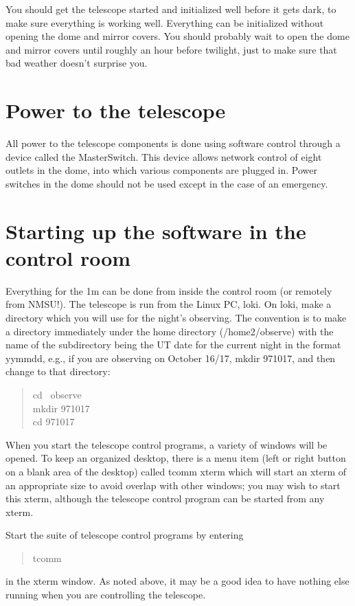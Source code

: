\documentclass[10pt]{report}
\renewcommand{\[}{\begin{eqnarray}}
\renewcommand{\]}{\end{eqnarray}}
\begin{document}
You should get the telescope started and initialized well before it gets
dark, to make sure everything is working well. Everything can be initialized
without opening the dome and mirror covers. You should probably wait to
open the dome and mirror covers until roughly an hour before twilight,
just to make sure that bad weather doesn't surprise you.

\section{Power to the telescope}

All power to the telescope components is done using software control
through a device called the MasterSwitch. This device allows network control
of eight outlets in the dome, into which various components are plugged
in. Power switches in the dome should not be used except in the case
of an emergency. 

\section{Starting up the software in the control room}
Everything for the 1m can be done from inside the control room (or remotely from
NMSU!). The telescope is run from the Linux PC, loki. On loki, make
a directory which you will use for the night's observing. The convention
is to make a directory immediately under the home directory (/home2/observe)
with the name of the subdirectory being the UT date for the current
night in the format yymmdd, e.g., if you are observing on October
16/17, mkdir 971017, and then change to that directory:  
\begin{quote}
cd ~observe\\ 
mkdir 971017\\ 
cd 971017\\ 
\end{quote}

When you start the telescope control programs, a variety of windows will
be opened. To keep an organized desktop, there is a menu item (left or
right button on a blank area of the desktop) called tcomm xterm which will
start an xterm of an appropriate size to avoid overlap with other windows;
you may wish to start this xterm, although the telescope control program
can be started from any xterm.

Start the suite of telescope control programs by entering
\begin{quote} tcomm \end{quote} in the xterm window. 
As noted above, it may be a good idea to
have nothing else running when you are controlling the telescope.
\end{document}
